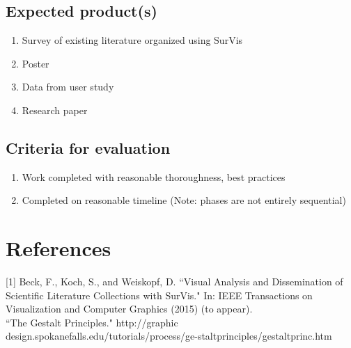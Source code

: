 \documentclass[12pt, twocolumn]{article}
\begin{document}
\subsection{Expected product(s)}
\begin{enumerate}
	\item Survey of existing literature organized using SurVis
	\item Poster
	\item Data from user study
	\item Research paper
\end{enumerate}
\subsection{Criteria for evaluation}
\begin{enumerate}
	\item Work completed with reasonable thoroughness, best practices
	\item Completed on reasonable timeline (Note: phases are not entirely sequential)
\end{enumerate}

\section{References}
[1] Beck, F., Koch, S., and Weiskopf, D. ``Visual Analysis and Dissemination of Scientific Literature Collections with SurVis." In: IEEE Transactions on Visualization and Computer Graphics (2015) (to appear).
\\

\noindent
[2] ``The Gestalt Principles." http://graphic design.spokanefalls.edu/tutorials/process/ge-staltprinciples/gestaltprinc.htm\\
\end{document}
